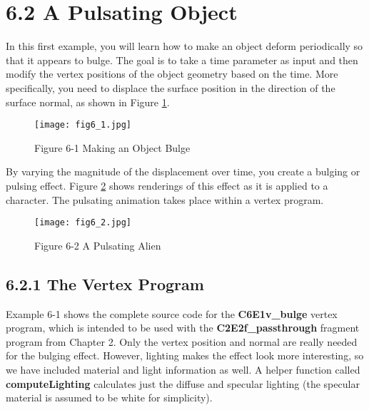\documentclass[../main.tex]{subfiles}
\begin{document}
\section{6.2 A Pulsating Object}

In this first example, you will learn how to make an object deform periodically so that it appears to bulge. The goal is to take a time parameter as input and then modify the vertex positions of the object geometry based on the time. More specifically, you need to displace the surface position in the direction of the surface normal, as shown in Figure \ref{fig:6-1}.

\begin{figure}
    \centering
    \texttt{[image: fig6\_1.jpg]}
    \caption{Figure 6-1 Making an Object Bulge}
    \label{fig:6-1}
\end{figure}

By varying the magnitude of the displacement over time, you create a bulging or pulsing effect. Figure \ref{fig:6-2} shows renderings of this effect as it is applied to a character. The pulsating animation takes place within a vertex program.

\begin{figure}
    \centering
    \texttt{[image: fig6\_2.jpg]}
    \caption{Figure 6-2 A Pulsating Alien}
    \label{fig:6-2}
\end{figure}

\subsection{6.2.1 The Vertex Program}

Example 6-1 shows the complete source code for the \textbf{C6E1v_bulge} vertex program, which is intended to be used with the \textbf{C2E2f_passthrough} fragment program from Chapter 2. Only the vertex position and normal are really needed for the bulging effect. However, lighting makes the effect look more interesting, so we have included material and light information as well. A helper function called \textbf{computeLighting} calculates just the diffuse and specular lighting (the specular material is assumed to be white for simplicity).
\end{document}
